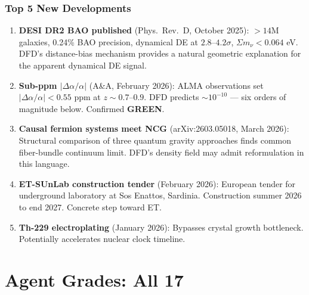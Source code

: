 \documentclass[11pt,a4paper]{article}
\newcommand{\GREEN}{\textcolor{dfdgreen}{\textbf{GREEN}}}
\begin{document}
\section{Top 5 New Developments}

\begin{enumerate}
\item \textbf{DESI DR2 BAO published} (Phys.\ Rev.\ D, October 2025): $>14$M galaxies, 0.24\% BAO precision, dynamical DE at $2.8$--$4.2\sigma$, $\Sigma m_\nu < 0.064$ eV. DFD's distance-bias mechanism provides a natural geometric explanation for the apparent dynamical DE signal.

\item \textbf{Sub-ppm $|\Delta\alpha/\alpha|$} (A\&A, February 2026): ALMA observations set $|\Delta\alpha/\alpha| < 0.55$ ppm at $z \sim 0.7$--$0.9$. DFD predicts $\sim 10^{-10}$ --- six orders of magnitude below. Confirmed \GREEN.

\item \textbf{Causal fermion systems meet NCG} (arXiv:2603.05018, March 2026): Structural comparison of three quantum gravity approaches finds common fiber-bundle continuum limit. DFD's density field may admit reformulation in this language.

\item \textbf{ET-SUnLab construction tender} (February 2026): European tender for underground laboratory at Sos Enattos, Sardinia. Construction summer 2026 to end 2027. Concrete step toward ET.

\item \textbf{Th-229 electroplating} (January 2026): Bypasses crystal growth bottleneck. Potentially accelerates nuclear clock timeline.
\end{enumerate}


\part{Agent Grades: All 17}
\end{document}
